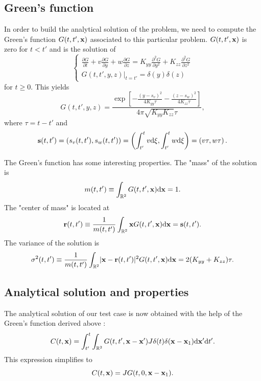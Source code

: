 


\subsection*{Green's function}
In order to build the analytical solution of the problem, we need to compute the Green's function $\G$ associated to this particular problem. $\G$ is zero for $t<t'$ and is the solution of
\begin{equation}
	\begin{cases}
		\frac{\partial G}{\partial t} + v \frac{\partial G}{\partial y} + w\frac{\partial G}{\partial z} = K_{yy}\frac{\partial^2 G}{\partial y^2} + K_{zz}\frac{\partial^2 G}{\partial z^2}\\[.1cm]
		\left. G(t,t',y,z) \right \rvert_{t=t'} = \delta(y)\delta(z) 
	\end{cases}
\end{equation}
for $t \ge 0$. This yields
\begin{equation} 
	G(t,t',y,z) = \frac{\exp\left[-\frac{(y-s_v)^2}{4K_{yy}\tau} -\frac{(z-s_w)^2}{4K_{zz}\tau} \right]}{4\pi\sqrt{K_{yy}K_{zz}}\tau},
\end{equation}
where $\tau = t-t'$ and 
\begin{equation}
	\b s(t,t') = (s_v(t,t'), s_w(t,t')) = \left(\int_{t'}^{t}v \rm d \xi, \int_{t'}^{t}w \rm d \xi \right) = \left(v\tau, w\tau\right).
\end{equation}

The Green's function has some interesting properties. The "mass" of the solution is
\begin{equation} \label{eq:testcase:propmass}
	m(t,t') \equiv \int_{\R[2]} \G \rm d \b x = 1.
\end{equation}
The "center of mass" is located at
\begin{equation} \label{eq:testcase:propcenter}
	\b r(t,t') \equiv \frac{1}{m(t,t')} \int_{\R[2]} \b x \G \rm d \b x  = \b s(t,t').
\end{equation}
The variance of the solution is
\begin{equation} \label{eq:testcase:propvar}
	\sigma^2(t,t') \equiv \frac{1}{m(t,t')} \int_{\R[2]} \lvert \b x - \b r(t,t') \rvert^2 \G \rm d \b x = 2 (K_{yy}+K_{zz}) \tau.
\end{equation}

\subsection*{Analytical solution and properties}
The analytical solution of our test case is now obtained with the help of the Green's function derived above :
\begin{equation}
	C(t,\b x) = \int_{t'}^{t} \int_{\R[2]} G(t,t',\b x - \b x') J \delta(t) \delta(\b x- \b x_1) \rm d \b{x}' \rm dt'.
\end{equation}
This expression simplifies to
\begin{equation}
	C(t,\b x) = J G(t,0,\b x - \b x_1).
\end{equation}


